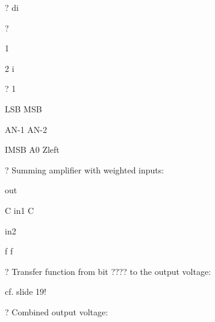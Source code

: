 \documentclass[2pt,landscape]{article}
\begin{document}
\begin{multicols*}{5}
? di


?

1

2
i

?
1














LSB	MSB







AN-1	AN-2


IMSB
A0
Zleft



?	Summing amplifier with weighted inputs:



































out


C	in1	C


in2


f	f



?	Transfer function from bit ???? to the output voltage:















cf. slide 19!




?	Combined output voltage:






























\end{multicols*}
\end{document}
